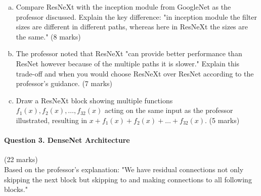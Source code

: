 \documentclass[12pt]{article}
\newcommand{\shortanswer}{\vspace{2cm}}
\newcommand{\mediumanswer}{\vspace{3cm}}
\begin{document}
\begin{enumerate}[(a)]
    \item Compare ResNeXt with the inception module from GoogleNet as the professor discussed. Explain the key difference: "in inception module the filter sizes are different in different paths, whereas here in ResNeXt the sizes are the same." \hfill (8 marks)
    
    \mediumanswer
    
    \item The professor noted that ResNeXt "can provide better performance than ResNet however because of the multiple paths it is slower." Explain this trade-off and when you would choose ResNeXt over ResNet according to the professor's guidance. \hfill (7 marks)
    
    \mediumanswer
    
    \item Draw a ResNeXt block showing multiple functions $f_1(x), f_2(x), \ldots, f_{32}(x)$ acting on the same input as the professor illustrated, resulting in $x + f_1(x) + f_2(x) + \ldots + f_{32}(x)$. \hfill (5 marks)
    
    \shortanswer
\end{enumerate}

\newpage
\paragraph{Question 3. DenseNet Architecture}{\hfill (22 marks)}\\
Based on the professor's explanation: "We have residual connections not only skipping the next block but skipping to and making connections to all following blocks."
\end{document}
